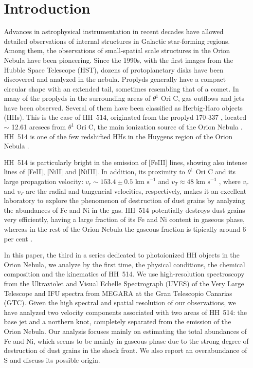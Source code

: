 \documentclass[fleqn,usenatbib]{mnras}
\begin{document}


\section{Introduction}
\label{sec:introduction}

Advances in astrophysical instrumentation in recent decades have allowed detailed observations of internal structures in Galactic star-forming regions. Among them, the observations of small-spatial scale structures in the Orion Nebula have been pioneering. Since the 1990s, with the first images from the Hubble Space Telescope (HST), dozens of protoplanetary disks \citep[proplyds,][]{Odell1993} have been discovered and analyzed in the nebula. Proplyds generally have a compact circular shape with an extended tail, sometimes resembling that of a comet. In many of the proplyds in the surrounding areas of $\theta^1$ Ori C, gas outflows and jets have been observed. Several of them have been classified as Herbig-Haro objects (HHs). This is the case of HH~514, originated from the proplyd 170-337 \citep[][]{bally00}, located $\sim$ 12.61 arcsecs from $\theta^1$ Ori C, the main ionization source of the Orion Nebula \citep[][]{ODell2017}. HH~514 is one of the few redshifted HHs in the Huygens region of the Orion Nebula \citep[][]{odellyhenney08}.

HH~514 is particularly bright in the emission of [Fe\thinspace III] lines, showing also intense lines of  [Fe\thinspace II], [Ni\thinspace II] and [Ni\thinspace III]. In addition, its proximity to $\theta^1$ Ori C and its large propagation velocity: $v_{r} \sim 153.4 \pm 0.5  \text{ km s}^{-1}$ and $ v_{T} \approx 48 \text{ km s}^{-1}$ \citep{odellyhenney08}, where $v_{r}$ and $v_{T}$ are the radial and tangencial velocities, respectively, makes it an excellent laboratory to explore the phenomenon of destruction of dust grains by analyzing the abundances of Fe and Ni in the gas. HH~514 potentially destroys dust grains very efficiently, having a large fraction of its Fe and Ni content in gaseous phase, whereas in the rest of the Orion Nebula the gaseous fraction is tipically around 6 per cent \citep[][]{mendez2021-2}.

In this paper, the third in a series dedicated to photoionized HH objects in the Orion Nebula, we analyze by the first time, the physical conditions, the chemical composition and the kinematics of HH~514. We use high-resolution spectroscopy from the Ultraviolet and Visual Echelle Spectrograph (UVES) \citep[][]{Dodorico00} of the Very Large Telescope and IFU spectra from MEGARA \citep{gildepaz+18} at the Gran Telescopio Canarias (GTC). Given the high spectral and spatial resolution of our observations, we have analyzed two velocity components associated with two areas of HH~514: the base jet and a northern knot, completely separated from the emission of the Orion Nebula. Our analysis focuses mainly on estimating the total abundances of Fe and Ni, which seems to be mainly in gaseous phase due to the strong degree of destruction of dust grains in the shock front. We also report an overabundance of S and discuss its possible origin.
\end{document}
